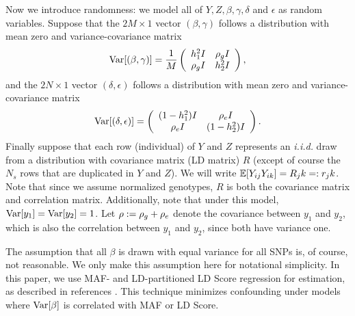 \documentclass[11pt]{article}
\numberwithin{equation}{section}
\numberwithin{definition}{section}
\numberwithin{thm}{section}
\numberwithin{lemma}{section}
\numberwithin{prop}{section}
\numberwithin{cor}{section}
\numberwithin{hyp}{section}
\begin{document}
Now we introduce randomness:
we model all of $Y, Z, \beta, \gamma, \delta $ and $\epsilon$ as random variables.
Suppose that the $2M\times1$ vector $(\beta, \gamma)$ follows a distribution with mean zero and variance-covariance matrix\
\begin{equation*} 
	\mathrm{Var}[(\beta, \gamma)] = \frac{1}{M}
		\left( \begin{array}{cc}
		h_{1}^2 I & \rho_g I\\
		\rho_g I& h_{2}^2  I
	\end{array} \right),
\end{equation*}
and the $2N\times1$ vector $(\delta, \epsilon)$ follows a distribution with mean zero and variance-covariance matrix
\begin{equation*}
	\mathrm{Var}[(\delta, \epsilon)] = 
		\left( \begin{array}{cc}
		(1-h_{1}^2) I & \rho_e I\\
		\rho_e I& (1-h_{2}^2) I
	\end{array} \right).
\end{equation*}
Finally suppose that each row (individual) of $Y$ and $Z$ 
represents an \emph{i.i.d.} draw from a distribution with covariance matrix (LD matrix) $R$
(except of course the $N_s$ rows that are duplicated in $Y$ and $Z$).
We will write $\mathbb{E}[Y_{ij}Y_{ik}] = R_jk =: r_jk$. 
Note that since we assume normalized genotypes,
$R$ is both the covariance matrix and correlation matrix. 
Additionally, note that under this model, $\mathrm{Var}[y_1] = \mathrm{Var}[y_2] = 1$. 
Let $\rho := \rho_g + \rho_e$ denote the covariance between $y_1$ and $y_2$,
which is also the correlation between $y_1$ and $y_2$, since both have variance one.

The assumption that all $\beta$ is drawn with equal variance for all SNPs is, of course, not reasonable.
We only make this assumption here for notational simplicity. 
In this paper, we use MAF- and LD-partitioned LD Score regression for estimation, as described in references \cite{finucane2014partitioning,buliksullivan2014kernel}.
This technique minimizes confounding under models where $\mathrm{Var}[\beta]$ is correlated with MAF or LD Score.
\end{document}
